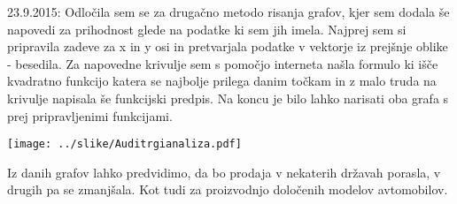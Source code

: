 \documentclass[11pt,a4paper]{article}
\begin{document}
23.9.2015: Odločila sem se za drugačno metodo risanja grafov, kjer sem dodala še napovedi za prihodnost glede na podatke ki sem jih imela. Najprej sem si pripravila zadeve za x in y osi in pretvarjala podatke v vektorje iz prejšnje oblike - besedila. Za napovedne krivulje sem s pomočjo interneta našla formulo ki išče kvadratno funkcijo katera se najbolje prilega danim točkam in z malo truda na krivulje napisala še funkcijski predpis. Na koncu je bilo lahko narisati oba grafa s prej pripravljenimi funkcijami.

\texttt{[image: ../slike/Auditrgianaliza.pdf]}

Iz danih grafov lahko predvidimo, da bo prodaja v nekaterih državah porasla, v drugih pa se zmanjšala. Kot tudi za proizvodnjo določenih modelov avtomobilov.
\end{document}

